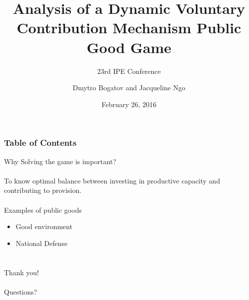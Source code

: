 \documentclass[xcolor={dvipsnames, usenames}, aspectratio=43]{beamer}
\begin{document}

	\title[Public Good Game]{Analysis of a Dynamic Voluntary Contribution Mechanism Public Good Game}
	\subtitle[23rd IPE Conference]{23rd IPE Conference}
	\author[Dmytro Bogatov]{Dmytro Bogatov and Jacqueline Ngo}
	\date[\today]{February 26, 2016}

	\begin{frame}
		\titlepage
	\end{frame}

	\begin{frame}
		\frametitle{Table of Contents}
		\tableofcontents[]
	\end{frame} 

	\begin{frame}
		Why Solving the game is important?
		\\~\\
		To know optimal balance between investing in productive capacity and contributing to provision.
		\\~\\
		Examples of public goods
		\begin{itemize}
			\item
				Good environment
			\item
				National Defense
		\end{itemize}
	\end{frame} 

		

	\section{}

	\begin{frame}
		\begin{center}
			\Huge Thank you!
			\\~\\
			\Large Questions?
		\end{center}
	\end{frame} 

	\begin{frame}
		\titlepage
	\end{frame}
\end{document}
